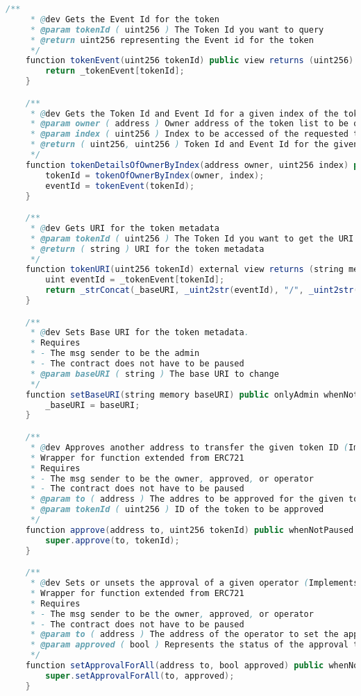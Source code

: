 \documentclass[MSE,Master,english]{twbook}%
\begin{document}
\begin{lstlisting}[language=Java, name={POAP Smart Contract}, label={sc:poapContract}]
    /**
     * @dev Gets the Event Id for the token
     * @param tokenId ( uint256 ) The Token Id you want to query
     * @return uint256 representing the Event id for the token
     */
    function tokenEvent(uint256 tokenId) public view returns (uint256) {
        return _tokenEvent[tokenId];
    }

    /**
     * @dev Gets the Token Id and Event Id for a given index of the tokens list of the requested owner
     * @param owner ( address ) Owner address of the token list to be queried
     * @param index ( uint256 ) Index to be accessed of the requested tokens list
     * @return ( uint256, uint256 ) Token Id and Event Id for the given index of the tokens list owned by the requested address
     */
    function tokenDetailsOfOwnerByIndex(address owner, uint256 index) public view returns (uint256 tokenId, uint256 eventId) {
        tokenId = tokenOfOwnerByIndex(owner, index);
        eventId = tokenEvent(tokenId);
    }

    /**
     * @dev Gets URI for the token metadata
     * @param tokenId ( uint256 ) The Token Id you want to get the URI
     * @return ( string ) URI for the token metadata 
     */
    function tokenURI(uint256 tokenId) external view returns (string memory) {
        uint eventId = _tokenEvent[tokenId];
        return _strConcat(_baseURI, _uint2str(eventId), "/", _uint2str(tokenId), "");
    }

    /**
     * @dev Sets Base URI for the token metadata.
     * Requires 
     * - The msg sender to be the admin
     * - The contract does not have to be paused
     * @param baseURI ( string ) The base URI to change
     */
    function setBaseURI(string memory baseURI) public onlyAdmin whenNotPaused {
        _baseURI = baseURI;
    }

    /**
     * @dev Approves another address to transfer the given token ID (Implements ERC71)
     * Wrapper for function extended from ERC721 
     * Requires 
     * - The msg sender to be the owner, approved, or operator
     * - The contract does not have to be paused
     * @param to ( address ) The addres to be approved for the given token ID
     * @param tokenId ( uint256 ) ID of the token to be approved
     */
    function approve(address to, uint256 tokenId) public whenNotPaused {
        super.approve(to, tokenId);
    }

    /**
     * @dev Sets or unsets the approval of a given operator (Implements ERC71)
     * Wrapper for function extended from ERC721
     * Requires 
     * - The msg sender to be the owner, approved, or operator
     * - The contract does not have to be paused
     * @param to ( address ) The address of the operator to set the approval
     * @param approved ( bool ) Represents the status of the approval to be set
     */
    function setApprovalForAll(address to, bool approved) public whenNotPaused {
        super.setApprovalForAll(to, approved);
    }


\end{lstlisting}
\end{document}
